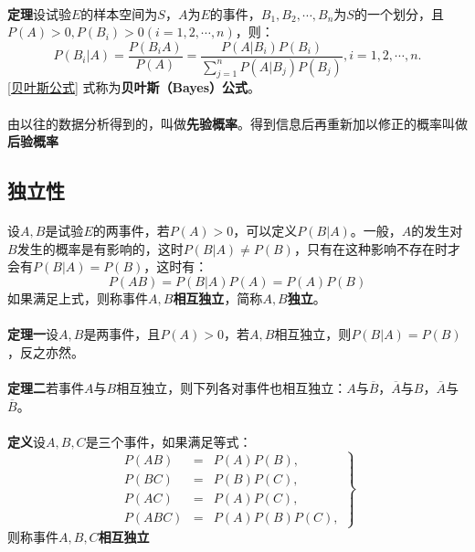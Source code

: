 \paragraph{}
\textbf{定理\;}设试验$E$的样本空间为$S$，$A$为$E$的事件，$B_1,B_2,\cdots,B_n$为$S$的一个划分，且$P(A)>0, P(B_i)>0(i=1,2,\cdots,n)$，则：
\begin{equation}
  \label{贝叶斯公式}
  P(B_i |A) = \frac{P(B_iA)}{P(A)} = \frac{P(A|B_i)P(B_i)}{\displaystyle \sum_{j=1}^n P(A|B_j)P(B_j)}, i = 1,2,\cdots,n.
\end{equation}
\eqref{贝叶斯公式} 式称为\textbf{贝叶斯（Bayes）公式}。

\paragraph{}
由以往的数据分析得到的，叫做\textbf{先验概率}。得到信息后再重新加以修正的概率叫做\textbf{后验概率}

\subsection{独立性}
\paragraph{}
设$A,B$是试验$E$的两事件，若$P(A)>0$，可以定义$P(B|A)$。一般，$A$的发生对$B$发生的概率是有影响的，这时$P(B|A) \neq P(B)$，只有在这种影响不存在时才会有$P(B|A)=P(B)$，这时有：
\begin{equation}
  P(AB) = P(B|A)P(A) = P(A)P(B)
\end{equation}
如果满足上式，则称事件$A,B$\textbf{相互独立}，简称$A,B$\textbf{独立}。

\paragraph{}
\textbf{定理一\;}设$A,B$是两事件，且$P(A)>0$，若$A,B$相互独立，则$P(B|A)=P(B)$，反之亦然。

\paragraph{}
\textbf{定理二\;}若事件$A$与$B$相互独立，则下列各对事件也相互独立：$A$与$\overline{B}$，$\overline{A}$与$B$，$\overline{A}$与$\overline{B}$。

\paragraph{}
\textbf{定义\;}设$A,B,C$是三个事件，如果满足等式：
\begin{equation}
  \left. \begin{array}{rcl}
    P(AB) & = & P(A)P(B), \\
    P(BC) & = & P(B)P(C), \\
    P(AC) & = & P(A)P(C), \\
    P(ABC) & = & P(A)P(B)P(C),
  \end{array} \right\}
\end{equation}
则称事件$A,B,C$\textbf{相互独立}

